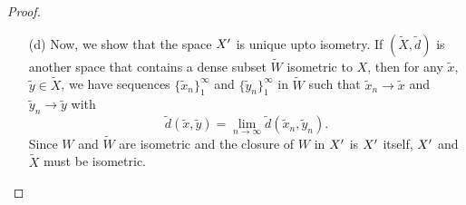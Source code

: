 \begin{solution}
\begin{proof}
\begin{enumerate}
                    \vspace*{3mm}
                    \item[(d)] Now, we show that the space $X^\prime$ is
                    unique upto isometry. If $(\tilde{X},\tilde{d})$
                    is another space that contains a dense
                    subset $\tilde{W}$ isometric to $X$, then
                    for any $\tilde{x}$, $\tilde{y}\in
                    \tilde{X}$, we have sequences $\{\tilde{x}_n\}
                    _1^\infty$
                    and $\{\tilde{y}_n\}
                    _1^\infty$ in $\tilde{W}$ such that
                    $\tilde{x}_n\to \tilde{x}$ and 
                    $\tilde{y}_n\to \tilde{y}$ with
                    $$\tilde{d}(\tilde{x},\tilde{y})=
                    \lim_{n\to\infty}
                    {\tilde{d}(\tilde{x}_n,\tilde{y}_n)}.$$
                    Since $W$ and $\tilde{W}$ are isometric
        and the closure of $W$ in $X^\prime$ is
        $X^\prime$ itself, $X^\prime$ and $\tilde{X}$
        must be isometric.
        \end{enumerate}
    \end{proof}
\end{solution}